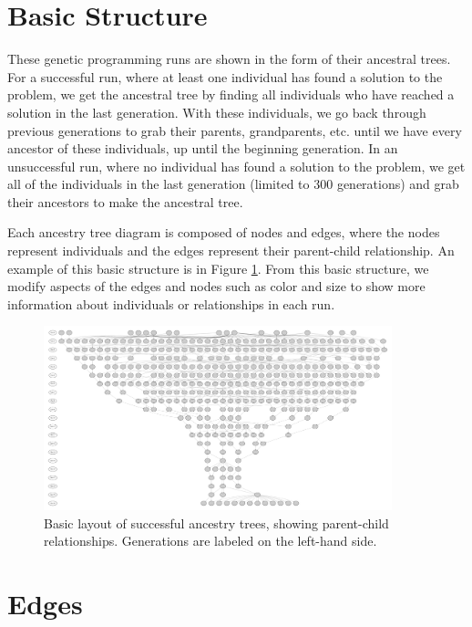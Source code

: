 \documentclass{sig-alternate}
\begin{document}
\section{Basic Structure}
\label{sec:basics}
These genetic programming runs are shown in the form of their ancestral trees. For a successful run, where at least one individual has found a solution to the problem, we get the ancestral tree by finding all individuals who have reached a solution in the last generation. With these individuals, we go back through previous generations to grab their parents, grandparents, etc. until we have every ancestor of these individuals, up until the beginning generation. In an unsuccessful run, where no individual has found a solution to the problem, we get all of the individuals in the last generation (limited to 300 generations) and grab their ancestors to make the ancestral tree. 

Each ancestry tree diagram is composed of nodes and edges, where the nodes represent individuals and the edges represent their parent-child relationship. An example of this basic structure is in Figure \ref{fig:lexRun0Basic}. From this basic structure, we modify aspects of the edges and nodes such as color and size to show more information about individuals or relationships in each run.

\begin{figure}
	\begin{center}
		\includegraphics[width=0.9\textwidth]{../Figures/run0_basic_structure.pdf}
	\end{center}
	\caption{Basic layout of successful ancestry trees, showing parent-child relationships. Generations are labeled on the left-hand side.}
	\label{fig:lexRun0Basic}
\end{figure}

\section{Edges}
\label{sec:edges}
\end{document}
